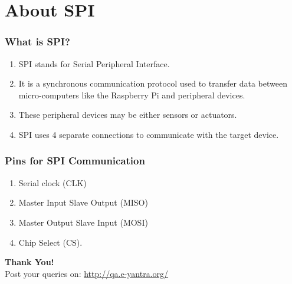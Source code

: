 \documentclass[10pt,red]{beamer}
\title
[
	Raspberry Pi Hardware Development	%
	\hspace{0.5cm}
	\insertframenumber/\inserttotalframenumber
]
{
	SPI enabling on Raspberry Pi
}
\author
[
	www.e-yantra.org
]
{
	e-Yantra Team \\
  Embedded Real-Time Systems Lab\\
  Indian Institute of Technology-Bombay \\
}
\date
{
IIT Bombay \\ {\today}
}
\begin{document}
 

\begin{frame}
	\titlepage
\end{frame} 

\section{About SPI}
\begin{frame}
	\frametitle{What is SPI?}  \pause
	\begin{enumerate} [$\checkmark$]
		\item<+-|alert@+> SPI stands for Serial Peripheral Interface.  
		\item<+-|alert@+> It is a synchronous communication protocol used to transfer data between micro-computers like the Raspberry Pi and peripheral devices.
		\item<+-|alert@+> These peripheral devices may be either sensors or actuators.
		\item<+-|alert@+> SPI uses 4 separate connections to communicate with the target device.
		
	\end{enumerate}
\end{frame}
\begin{frame}
	\frametitle{Pins for SPI Communication} \pause
	\begin{enumerate}
		\item<+-|alert@+> Serial clock (CLK)
		\item<+-|alert@+> Master Input Slave Output (MISO)
		\item<+-|alert@+>Master Output Slave Input (MOSI)
		\item<+-|alert@+>Chip Select (CS).
	\end{enumerate}
\end{frame}

\begin{frame}
	\hskip4cm
	\textbf{\LARGE Thank You!} \\[20pt]
	\hskip3cm
	\scriptsize Post your queries on: 
	\hyperref[www.e-yantra.org]{\color{blue} http://qa.e-yantra.org/ \color{black}} 
\end{frame}
\end{document}
